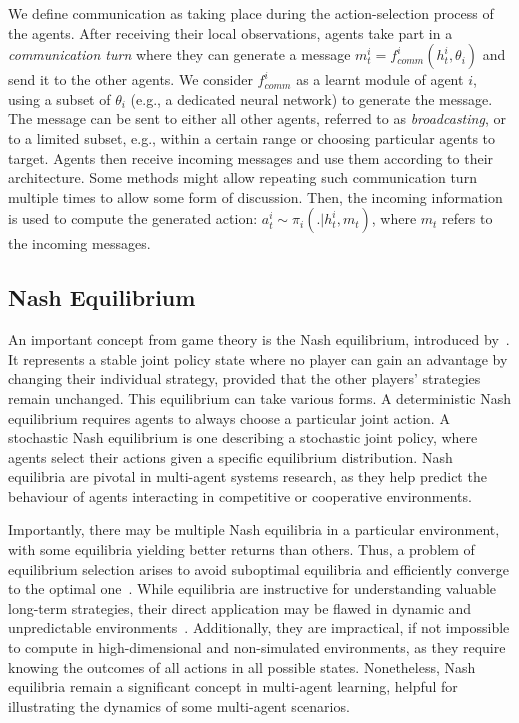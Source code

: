 We define communication as taking place during the action-selection process of the agents. After receiving their local observations, agents take part in a \textit{communication turn} where they can generate a message $m^i_t=f^i_{comm}(h^i_t,\theta_i)$ and send it to the other agents. We consider $f^i_{comm}$ as a learnt module of agent $i$, using a subset of $\theta_i$ (e.g., a dedicated neural network) to generate the message. The message can be sent to either all other agents, referred to as \textit{broadcasting}, or to a limited subset, e.g., within a certain range or choosing particular agents to target. Agents then receive incoming messages and use them according to their architecture. Some methods might allow repeating such communication turn multiple times to allow some form of discussion. Then, the incoming information is used to compute the generated action: $a^i_t\sim\pi_i(.|h^i_t,m_t)$, where $m_t$ refers to the incoming messages. 



\subsection{Nash Equilibrium}\label{sec:MAL:Nash_Eq}

An important concept from game theory is the Nash equilibrium, introduced by~\cite{Nash1950}. It represents a stable joint policy state where no player can gain an advantage by changing their individual strategy, provided that the other players' strategies remain unchanged. This equilibrium can take various forms. A deterministic Nash equilibrium requires agents to always choose a particular joint action. A stochastic Nash equilibrium is one describing a stochastic joint policy, where agents select their actions given a specific equilibrium distribution. Nash equilibria are pivotal in multi-agent systems research, as they help predict the behaviour of agents interacting in competitive or cooperative environments. 

Importantly, there may be multiple Nash equilibria in a particular environment, with some equilibria yielding better returns than others. Thus, a problem of equilibrium selection arises to avoid suboptimal equilibria and efficiently converge to the optimal one~\citep{Harsanyi1988_EqSec, Kalai1993_Rational, Bowling2002_WoLFIGA, Conitzer2007_Awesome}. 
While equilibria are instructive for understanding valuable long-term strategies, their direct application may be flawed in dynamic and unpredictable environments~\citep{Shoham2007_MAL}. Additionally, they are impractical, if not impossible to compute in high-dimensional and non-simulated environments, as they require knowing the outcomes of all actions in all possible states. Nonetheless, Nash equilibria remain a significant concept in multi-agent learning, helpful for illustrating the dynamics of some multi-agent scenarios.









